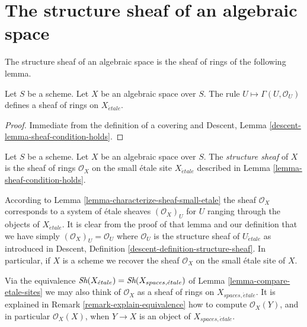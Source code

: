 \section{The structure sheaf of an algebraic space}
\label{section-structure sheaf}

\noindent
The structure sheaf of an algebraic space is the sheaf of rings of the
following lemma.

\begin{lemma}
\label{lemma-sheaf-condition-holds}
Let $S$ be a scheme. Let $X$ be an algebraic space over $S$.
The rule $U \mapsto \Gamma(U, \mathcal{O}_U)$ defines
a sheaf of rings on $X_{\acute{e}tale}$.
\end{lemma}

\begin{proof}
Immediate from the definition of a covering and
Descent, Lemma \ref{descent-lemma-sheaf-condition-holds}.
\end{proof}

\begin{definition}
\label{definition-structure-sheaf}
Let $S$ be a scheme.
Let $X$ be an algebraic space over $S$.
The {\it structure sheaf} of $X$
is the sheaf of rings $\mathcal{O}_X$
on the small \'etale site $X_{\acute{e}tale}$ described in
Lemma \ref{lemma-sheaf-condition-holds}.
\end{definition}

\noindent
According to Lemma \ref{lemma-characterize-sheaf-small-etale} the sheaf
$\mathcal{O}_X$ corresponds to a system of \'etale sheaves $(\mathcal{O}_X)_U$
for $U$ ranging through the objects of $X_{\acute{e}tale}$. It is clear from
the proof of that lemma and our definition that we have simply
$(\mathcal{O}_X)_U = \mathcal{O}_U$ where $\mathcal{O}_U$ is the structure
sheaf of $U_{\acute{e}tale}$ as introduced in
Descent, Definition \ref{descent-definition-structure-sheaf}.
In particular, if $X$ is a scheme we recover the sheaf $\mathcal{O}_X$
on the small \'etale site of $X$.

\medskip\noindent
Via the equivalence
$\mathop{\textit{Sh}}\nolimits(X_{\acute{e}tale}) = \mathop{\textit{Sh}}\nolimits(X_{spaces, \acute{e}tale})$
of Lemma \ref{lemma-compare-etale-sites} we may also think of $\mathcal{O}_X$
as a sheaf of rings on $X_{spaces, \acute{e}tale}$. It is explained in
Remark \ref{remark-explain-equivalence}
how to compute $\mathcal{O}_X(Y)$, and in particular $\mathcal{O}_X(X)$, when
$Y \to X$ is an object of $X_{spaces, \acute{e}tale}$.

